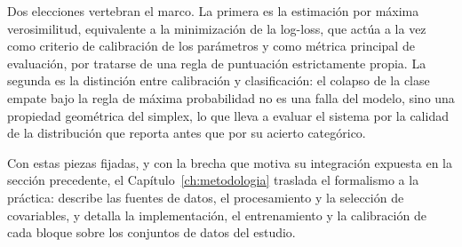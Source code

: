 Dos elecciones vertebran el marco. La primera es la estimaci\'on por m\'axima verosimilitud, equivalente a la minimizaci\'on de la log-loss, que act\'ua a la vez como criterio de calibraci\'on de los par\'ametros y como m\'etrica principal de evaluaci\'on, por tratarse de una regla de puntuaci\'on estrictamente propia. La segunda es la distinci\'on entre calibraci\'on y clasificaci\'on: el colapso de la clase empate bajo la regla de m\'axima probabilidad no es una falla del modelo, sino una propiedad geom\'etrica del simplex, lo que lleva a evaluar el sistema por la calidad de la distribuci\'on que reporta antes que por su acierto categ\'orico.

Con estas piezas fijadas, y con la brecha que motiva su integraci\'on expuesta en la secci\'on precedente, el Cap\'itulo~\ref{ch:metodologia} traslada el formalismo a la pr\'actica: describe las fuentes de datos, el procesamiento y la selecci\'on de covariables, y detalla la implementaci\'on, el entrenamiento y la calibraci\'on de cada bloque sobre los conjuntos de datos del estudio.